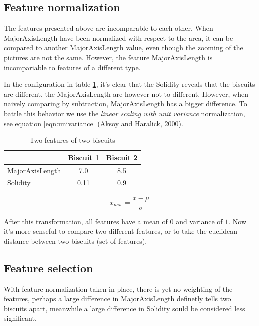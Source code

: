 \documentclass[a4paper,11pt]{article}
\begin{document}
\subsection{Feature normalization}
The features presented above are incomparable to each other.
When MajorAxisLength have been normalized with respect to the area, 
it can be compared to another MajorAxisLength value, 
even though the zooming of the pictures are not the same. 
However, the feature MajorAxisLength is incompariable to features of a different type.

In the configuration in table \ref{tab:features}, it's clear that the Solidity reveals that the biscuits
are different, the MajorAxisLength are however not to different.
However, when naively comparing by subtraction, MajorAxisLength has a bigger difference.
To battle this behavior we use the \emph{linear scaling with unit variance} normalization, see equation \ref{eqn:univariance} (Aksoy and Haralick, 2000).

\begin{table}[h!b!p!]
\caption{Two features of two biscuits}
\begin{center}
    \begin{tabular}{ l | c | c | }
                    & Biscuit 1 & Biscuit 2 \\ \hline
    MajorAxisLength & 7.0       & 8.5       \\ \hline
    Solidity        & 0.11      & 0.9       \\ \hline
    \end{tabular}
\end{center}
\label{tab:features}
\end{table}

\begin{equation}
x_{new} = \frac{x - \mu}{\sigma}
\label{eqn:univariance}
\end{equation}

After this transformation, all features have a mean of $0$ and variance of $1$.
Now it's more senseful to compare two different features, or to take the euclidean distance between two biscuits (set of features).
\subsection{Feature selection}
With feature normalization taken in place, there is yet no weighting of the features,
perhaps a large difference in MajorAxisLength definetly tells two biscuits apart,
meanwhile a large difference in Solidity sould be considered less significant.
\end{document}
